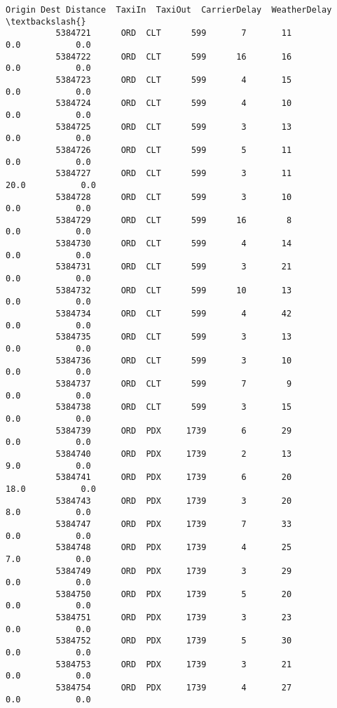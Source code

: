 \documentclass[11pt]{article}
\begin{document}
\begin{Verbatim}[commandchars=\\\{\}]
                    Origin Dest Distance  TaxiIn  TaxiOut  CarrierDelay  WeatherDelay  \textbackslash{}
          5384721      ORD  CLT      599       7       11           0.0           0.0   
          5384722      ORD  CLT      599      16       16           0.0           0.0   
          5384723      ORD  CLT      599       4       15           0.0           0.0   
          5384724      ORD  CLT      599       4       10           0.0           0.0   
          5384725      ORD  CLT      599       3       13           0.0           0.0   
          5384726      ORD  CLT      599       5       11           0.0           0.0   
          5384727      ORD  CLT      599       3       11          20.0           0.0   
          5384728      ORD  CLT      599       3       10           0.0           0.0   
          5384729      ORD  CLT      599      16        8           0.0           0.0   
          5384730      ORD  CLT      599       4       14           0.0           0.0   
          5384731      ORD  CLT      599       3       21           0.0           0.0   
          5384732      ORD  CLT      599      10       13           0.0           0.0   
          5384734      ORD  CLT      599       4       42           0.0           0.0   
          5384735      ORD  CLT      599       3       13           0.0           0.0   
          5384736      ORD  CLT      599       3       10           0.0           0.0   
          5384737      ORD  CLT      599       7        9           0.0           0.0   
          5384738      ORD  CLT      599       3       15           0.0           0.0   
          5384739      ORD  PDX     1739       6       29           0.0           0.0   
          5384740      ORD  PDX     1739       2       13           9.0           0.0   
          5384741      ORD  PDX     1739       6       20          18.0           0.0   
          5384743      ORD  PDX     1739       3       20           8.0           0.0   
          5384747      ORD  PDX     1739       7       33           0.0           0.0   
          5384748      ORD  PDX     1739       4       25           7.0           0.0   
          5384749      ORD  PDX     1739       3       29           0.0           0.0   
          5384750      ORD  PDX     1739       5       20           0.0           0.0   
          5384751      ORD  PDX     1739       3       23           0.0           0.0   
          5384752      ORD  PDX     1739       5       30           0.0           0.0   
          5384753      ORD  PDX     1739       3       21           0.0           0.0   
          5384754      ORD  PDX     1739       4       27           0.0           0.0   

\end{Verbatim}
\end{document}
